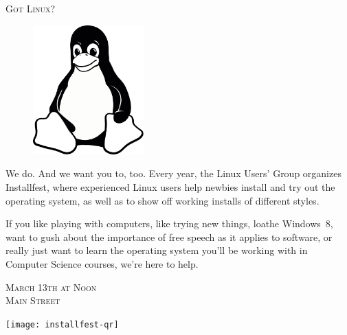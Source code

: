 \documentclass[12pt]{article}
\begin{document}
\pagestyle{empty}

\begin{center} \LARGE \scshape
    Got Linux?
\end{center}

\begin{figure}
    \vspace{-2em} %
    \begin{center}
        \includegraphics[width=0.38\textwidth]{tux-bw}
    \end{center}
    \vspace{-2em} %
\end{figure}

{\small

We do. And we want you to, too. Every year, the Linux Users' Group organizes
Installfest, where experienced Linux users help newbies install and try out the
operating system, as well as to show off working installs of different styles.

If you like playing with computers, like trying new things, loathe Windows~8,
want to gush about the importance of free speech as it applies to software, or
really just want to learn the operating system you'll be working with in
Computer Science courses, we're here to help.

}

\vfill

\begin{minipage}[bt]{0.58\textwidth}
    \begin{center}
        {\large \scshape
            March 13th at Noon\\
            Main Street
        }
    \end{center}
\end{minipage}
\begin{minipage}[bt]{0.38\textwidth}
    \begin{center}
        \texttt{[image: installfest-qr]}
    \end{center}
\end{minipage}
\end{document}
